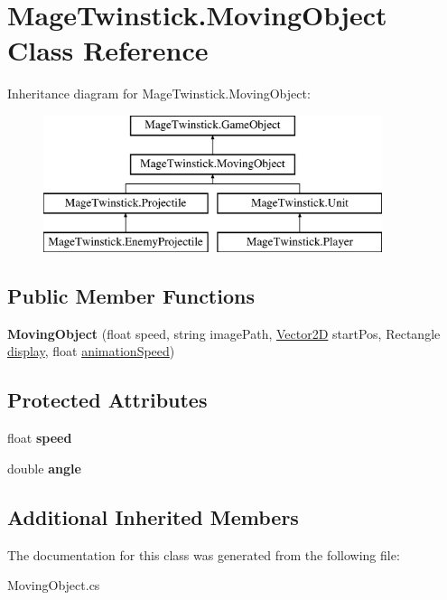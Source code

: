 \hypertarget{class_mage_twinstick_1_1_moving_object}{}\section{Mage\+Twinstick.\+Moving\+Object Class Reference}
\label{class_mage_twinstick_1_1_moving_object}
Inheritance diagram for Mage\+Twinstick.\+Moving\+Object\+:\begin{figure}[H]
\begin{center}
\leavevmode
\includegraphics[height=4.000000cm]{class_mage_twinstick_1_1_moving_object}
\end{center}
\end{figure}
\subsection*{Public Member Functions}
\begin{DoxyCompactItemize}
\item 
\hypertarget{class_mage_twinstick_1_1_moving_object_ab600a7d67a921669d7021f9c8b7b9891}{}{\bfseries Moving\+Object} (float speed, string image\+Path, \hyperlink{class_mage_twinstick_1_1_vector2_d}{Vector2\+D} start\+Pos, Rectangle \hyperlink{class_mage_twinstick_1_1_game_object_a5807df7f837dc87c8955a008d0b27b50}{display}, float \hyperlink{class_mage_twinstick_1_1_game_object_a5d21c31402c27c5a19f2a62d98720456}{animation\+Speed})\label{class_mage_twinstick_1_1_moving_object_ab600a7d67a921669d7021f9c8b7b9891}

\end{DoxyCompactItemize}
\subsection*{Protected Attributes}
\begin{DoxyCompactItemize}
\item 
\hypertarget{class_mage_twinstick_1_1_moving_object_ac7f09bc1fd21342a3c68b1d25c7e209d}{}float {\bfseries speed}\label{class_mage_twinstick_1_1_moving_object_ac7f09bc1fd21342a3c68b1d25c7e209d}

\item 
\hypertarget{class_mage_twinstick_1_1_moving_object_a93fbd4b287c423a80a525f4e45b93279}{}double {\bfseries angle}\label{class_mage_twinstick_1_1_moving_object_a93fbd4b287c423a80a525f4e45b93279}

\end{DoxyCompactItemize}
\subsection*{Additional Inherited Members}


The documentation for this class was generated from the following file\+:\begin{DoxyCompactItemize}
\item 
Moving\+Object.\+cs\end{DoxyCompactItemize}
